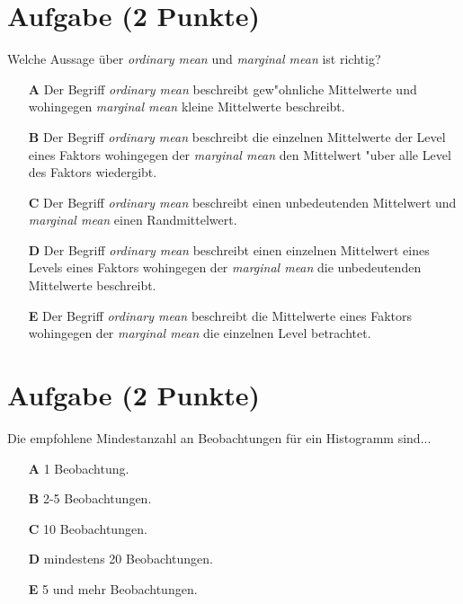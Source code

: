\documentclass[a4paper, 10pt]{scrartcl}\usepackage[]{graphicx}\usepackage[]{color}
\begin{document}
\section{Aufgabe \hfill (2 Punkte)}

Welche Aussage {\"u}ber \textit{ordinary mean} und \textit{marginal mean} ist richtig? 



\begin{enumerate}
\item [\textbf{A} \msquare] Der Begriff \textit{ordinary mean} beschreibt gew{"o}hnliche Mittelwerte und wohingegen \textit{marginal mean} kleine Mittelwerte beschreibt.
\item [\textbf{B} \msquare] Der Begriff \textit{ordinary mean} beschreibt die einzelnen Mittelwerte der Level eines Faktors wohingegen der \textit{marginal mean} den Mittelwert {"u}ber alle Level des Faktors wiedergibt.
\item [\textbf{C} \msquare] Der Begriff \textit{ordinary mean} beschreibt einen unbedeutenden Mittelwert und \textit{marginal mean} einen Randmittelwert.
\item [\textbf{D} \msquare] Der Begriff \textit{ordinary mean} beschreibt einen einzelnen Mittelwert eines Levels eines Faktors wohingegen der \textit{marginal mean} die unbedeutenden Mittelwerte beschreibt.
\item [\textbf{E} \msquare] Der Begriff \textit{ordinary mean} beschreibt die Mittelwerte eines Faktors wohingegen der \textit{marginal mean} die einzelnen Level betrachtet.
\end{enumerate} 

\section{Aufgabe \hfill (2 Punkte)}



Die empfohlene Mindestanzahl an Beobachtungen f{\"u}r ein Histogramm sind...



\begin{enumerate}
\item [\textbf{A} \msquare] 1 Beobachtung.
\item [\textbf{B} \msquare] 2-5 Beobachtungen.
\item [\textbf{C} \msquare] 10 Beobachtungen.
\item [\textbf{D} \msquare] mindestens 20 Beobachtungen.
\item [\textbf{E} \msquare] 5 und mehr Beobachtungen.
\end{enumerate} 
\end{document}

